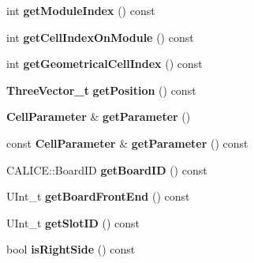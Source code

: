 \begin{DoxyCompactItemize}
\item 
int {\bfseries getModuleIndex} () const \label{classCALICE_1_1AdcValueAccess_a95ca34b9e83c716afdf0d759eb674964}

\item 
int {\bfseries getCellIndexOnModule} () const \label{classCALICE_1_1AdcValueAccess_a0fb4a1dafca50bc1ea71d845c242f9b5}

\item 
int {\bfseries getGeometricalCellIndex} () const \label{classCALICE_1_1AdcValueAccess_a6db60f9998a5eff3616f6cd22187127f}

\item 
{\bf ThreeVector\_\-t} {\bfseries getPosition} () const \label{classCALICE_1_1AdcValueAccess_a6bdb6f20b6c4f0eb84d664af3046ccd6}

\item 
{\bf CellParameter} \& {\bfseries getParameter} ()\label{classCALICE_1_1AdcValueAccess_a9adee792205759d44248b3cfd455dcd4}

\item 
const {\bf CellParameter} \& {\bfseries getParameter} () const \label{classCALICE_1_1AdcValueAccess_a5fb1b775c6659d9e93d67521960b69ea}

\item 
CALICE::BoardID {\bfseries getBoardID} () const \label{classCALICE_1_1AdcValueAccess_a5cf394acd1a40ad4d3881e1eadeaa9d0}

\item 
UInt\_\-t {\bfseries getBoardFrontEnd} () const \label{classCALICE_1_1AdcValueAccess_af7af31df48307b706d6f4b3631886a4b}

\item 
UInt\_\-t {\bfseries getSlotID} () const \label{classCALICE_1_1AdcValueAccess_a4895d6a36e954e932cdd472096d8261e}

\item 
bool {\bfseries isRightSide} () const \label{classCALICE_1_1AdcValueAccess_a179dda795ea999d66c7f7cecf7d6de24}

\end{DoxyCompactItemize}
